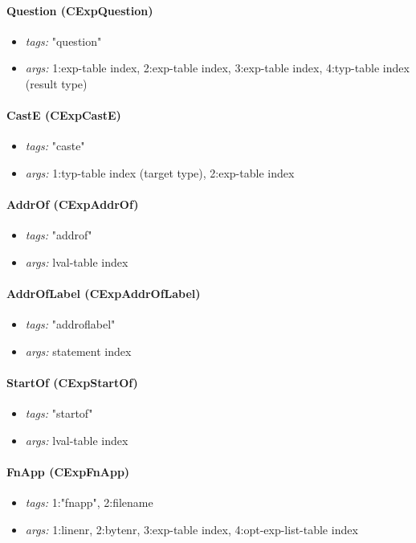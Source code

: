 \documentclass[11pt]{article}
\begin{document}
\paragraph{Question (CExpQuestion)}
\begin{itemize}
\item \emph{tags:} "question"
\item \emph{args:} 1:exp-table index, 2:exp-table index, 3:exp-table index, 4:typ-table index
      (result type)
\end{itemize}

\paragraph{CastE (CExpCastE)}
\begin{itemize}
\item \emph{tags:} "caste"
\item \emph{args:} 1:typ-table index (target type), 2:exp-table index
\end{itemize}

\paragraph{AddrOf (CExpAddrOf)}
\begin{itemize}
\item \emph{tags:} "addrof"
\item \emph{args:} lval-table index
\end{itemize}

\paragraph{AddrOfLabel (CExpAddrOfLabel)}
\begin{itemize}
\item \emph{tags:} "addroflabel"
\item \emph{args:} statement index
\end{itemize}

\paragraph{StartOf (CExpStartOf)}
\begin{itemize}
\item \emph{tags:} "startof"
\item \emph{args:} lval-table index
\end{itemize}

\paragraph{FnApp (CExpFnApp)}
\begin{itemize}
\item \emph{tags:} 1:"fnapp", 2:filename
\item \emph{args:} 1:linenr, 2:bytenr, 3:exp-table index, 4:opt-exp-list-table index
\end{itemize}
\end{document}
